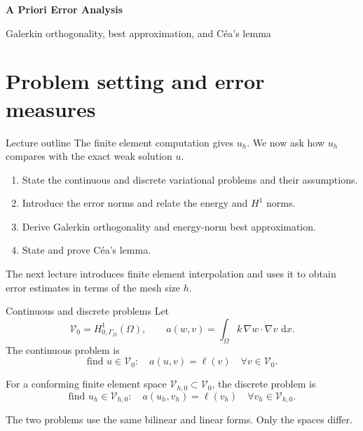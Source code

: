 \documentclass[11pt,aspectratio=169]{beamer}
\newcommand{\dd}{\,\mathrm{d}}
\newcommand{\Om}{\Omega}
\newcommand{\Gam}{\Gamma}
\newcommand{\Vzero}{\mathcal V_0}
\newcommand{\Vhzero}{\mathcal V_{h,0}}
\begin{document}
\begin{frame}[plain]
  \centering
  \vfill
  {\LARGE\bfseries A Priori Error Analysis\par}
  \vspace{0.45cm}
  {\large Galerkin orthogonality, best approximation, and C\'ea's lemma\par}
  \vfill
\end{frame}

\section{Problem setting and error measures}

\begin{frame}{Lecture outline}
The finite element computation gives $u_h$. We now ask how $u_h$ compares
with the exact weak solution $u$.

\begin{enumerate}
  \item State the continuous and discrete variational problems and their assumptions.
  \item Introduce the error norms and relate the energy and $H^1$ norms.
  \item Derive Galerkin orthogonality and energy-norm best approximation.
  \item State and prove C\'ea's lemma.
\end{enumerate}

\vspace{0.2cm}
The next lecture introduces finite element interpolation and uses it to obtain
error estimates in terms of the mesh size $h$.
\end{frame}

\begin{frame}{Continuous and discrete problems}
Let
\[
  \Vzero=H^1_{0,\Gam_D}(\Om),
  \qquad
  a(w,v)=\int_\Om k\,\nabla w\cdot\nabla v\,\dd x .
\]
The continuous problem is
\[
  \boxed{
  \text{find }u\in\Vzero:\quad
  a(u,v)=\ell(v)
  \quad\forall v\in\Vzero.}
\]

For a conforming finite element space $\Vhzero\subset\Vzero$, the discrete
problem is
\[
  \boxed{
  \text{find }u_h\in\Vhzero:\quad
  a(u_h,v_h)=\ell(v_h)
  \quad\forall v_h\in\Vhzero.}
\]

The two problems use the same bilinear and linear forms. Only the spaces differ.
\end{frame}
\end{document}
